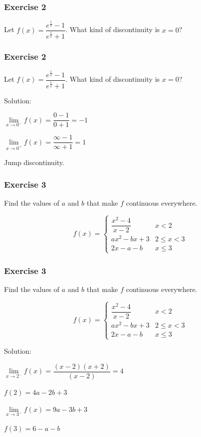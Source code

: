 \begin{frame}
    \frametitle{Exercise 2}
    Let $f(x) = \dfrac{e^{\frac{1}{x}} - 1}{e^{\frac{1}{x}} + 1}$. What kind of discontinuity is $x = 0$?
\end{frame}

\begin{frame}
    \frametitle{Exercise 2}
    Let $f(x) = \dfrac{e^{\frac{1}{x}} - 1}{e^{\frac{1}{x}} + 1}$. What kind of discontinuity is $x = 0$?

    Solution:

    $\lim\limits_{\textit{x} \to 0^-}f(x)=\dfrac{0-1}{0+1} = -1$

    $\lim\limits_{\textit{x} \to 0^+}f(x)=\dfrac{\infty - 1}{\infty + 1} = 1$

    Jump discontinuity.
\end{frame}

\begin{frame}
    \frametitle{Exercise 3}
    Find the values of $a$ and $b$ that make $f$ continuous everywhere.
    \begin{center}
        \begin{equation}
            f(x)=
            \begin{cases}
                \dfrac{x^{2} - 4}{x - 2} & x < 2        \\
                ax^{2} - b{x} + 3        & 2 \leq x < 3 \\
                2x - a - b               & x \leq 3
            \end{cases}
        \end{equation}
    \end{center}
\end{frame}

\begin{frame}
    \frametitle{Exercise 3}
    Find the values of $a$ and $b$ that make $f$ continuous everywhere.
    \begin{center}
        \begin{equation}
            f(x)=
            \begin{cases}
                \dfrac{x^{2} - 4}{x - 2} & x < 2        \\
                ax^{2} - b{x} + 3        & 2 \leq x < 3 \\
                2x - a - b               & x \leq 3
            \end{cases}
        \end{equation}
    \end{center}

    Solution:

    $\lim\limits_{\textit{x} \to 2^-}f(x)=\dfrac{(x-2)(x+2)}{(x-2)} = 4$

    $f(2)=4a-2b+3$

    $\lim\limits_{\textit{x} \to 3^-}f(x)=9a-3b+3$

    $f(3) = 6 - a -b$

\end{frame}


